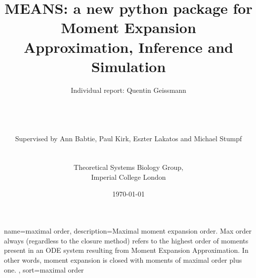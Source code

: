 \documentclass[11pt,a4paper]{article}
\begin{document}
\listoftodos
\newpage

\title{MEANS: a new python package for Moment Expansion Approximation, Inference and Simulation}
\author{Individual report: Quentin Geissmann \\
\\	
\\
\\
\\
Supervised by Ann Babtie, Paul Kirk, Eszter Lakatos and Michael Stumpf\\
\\
\\
Theoretical Systems Biology Group,\\
Imperial College London
}
\date{\today}

\clearpage\maketitle
\thispagestyle{empty}
\newpage{}


\pagebreak %
\tableofcontents


{
  name=maximal order,
  description={Maximal moment expansion order. Max order always (regardless to the closure method) refers to the highest order of 
  moments present in an ODE system resulting from Moment Expansion Approximation. 
  In other words, moment expansion is closed with moments of maximal order plus one.
   },
  sort=maximal order
}
\newpage{}
\printglossaries



\newpage{}
{}

\end{document}
